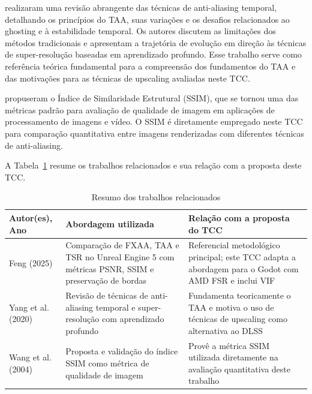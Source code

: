 \documentclass[twoside,english,brazilian]{UNISINOSmonografia}
\begin{document}
 realizaram uma revisão abrangente das técnicas de anti-aliasing temporal, detalhando os princípios do TAA, suas variações e os desafios relacionados ao ghosting e à estabilidade temporal. Os autores discutem as limitações dos métodos tradicionais e apresentam a trajetória de evolução em direção às técnicas de super-resolução baseadas em aprendizado profundo. Esse trabalho serve como referência teórica fundamental para a compreensão dos fundamentos do TAA e das motivações para as técnicas de upscaling avaliadas neste TCC.

 propuseram o Índice de Similaridade Estrutural (SSIM), que se tornou uma das métricas padrão para avaliação de qualidade de imagem em aplicações de processamento de imagens e vídeo. O SSIM é diretamente empregado neste TCC para comparação quantitativa entre imagens renderizadas com diferentes técnicas de anti-aliasing.

A Tabela~\ref{tab:trabalhos_relacionados} resume os trabalhos relacionados e sua relação com a proposta deste TCC.

\begin{table}[h]
    \caption{Resumo dos trabalhos relacionados}
    \label{tab:trabalhos_relacionados}
    \centering%
    \begin{minipage}{\textwidth}
        \begin{tabular*}{\textwidth}{p{3cm} p{5cm} p{6cm}}
            \hline
            \textbf{Autor(es), Ano} & \textbf{Abordagem utilizada} & \textbf{Relação com a proposta do TCC} \\
            \hline
            Feng (2025) & Comparação de FXAA, TAA e TSR no Unreal Engine 5 com métricas PSNR, SSIM e preservação de bordas & Referencial metodológico principal; este TCC adapta a abordagem para o Godot com AMD FSR e inclui VIF \\
            \hline
            Yang et al. (2020) & Revisão de técnicas de anti-aliasing temporal e super-resolução com aprendizado profundo & Fundamenta teoricamente o TAA e motiva o uso de técnicas de upscaling como alternativa ao DLSS \\
            \hline
            Wang et al. (2004) & Proposta e validação do índice SSIM como métrica de qualidade de imagem & Provê a métrica SSIM utilizada diretamente na avaliação quantitativa deste trabalho \\
            \hline
        \end{tabular*}
    \end{minipage}
\end{table}
\end{document}
